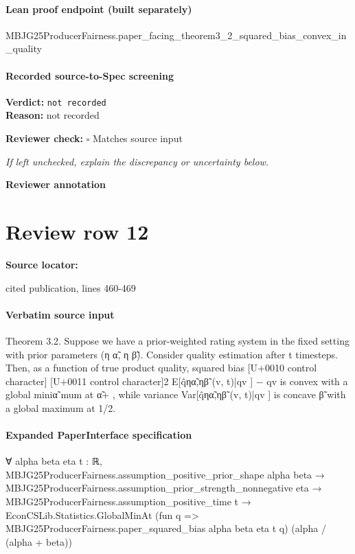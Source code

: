 \documentclass[10pt]{article}
\newcommand{\reviewerbox}{%
  \par\noindent\fbox{\parbox{0.96\linewidth}{\rule{0pt}{0.38in}}}\par
}
\newcommand{\reviewmatch}[1]{%
  \par\noindent\textbf{Reviewer check:} $\square$\; #1\par
  \noindent\emph{If left unchecked, explain the discrepancy or uncertainty below.}\par
}
\begin{document}
\paragraph{Lean proof endpoint (built separately)}\begin{ReviewVerbatim}
MBJG25ProducerFairness.paper_facing_theorem3_2_squared_bias_convex_in_quality
\end{ReviewVerbatim}

\paragraph{Recorded source-to-Spec screening}
\textbf{Verdict:} \texttt{not recorded}
\\
\textbf{Reason:} not recorded
\reviewmatch{Matches source input}
\noindent\textbf{Reviewer annotation}\par
\reviewerbox
\clearpage
\hypertarget{source-claim-444ef89e21ba4476}{}
\section*{Review row 12}
\textbf{Source locator:} {\footnotesize\raggedright cited publication, lines 460-\allowbreak{}469\par}
\paragraph{Verbatim source input}
\begin{ReviewVerbatim}
Theorem 3.2. Suppose we have a prior-weighted rating system in the fixed setting with prior parameters (η α̃, η β̃). Consider quality estimation after t timesteps.
Then, as a function of true product quality, squared bias
[U+0010 control character]
[U+0011 control character]2
E[q̂ηα̃,ηβ̃ (v, t)|qv ] − qv
is convex with a global miniα̃
mum at α̃+
, while variance Var[q̂ηα̃,ηβ̃ (v, t)|qv ] is concave
β̃
with a global maximum at 1/2.
\end{ReviewVerbatim}


\paragraph{Expanded PaperInterface specification}
\begin{ReviewVerbatim}
∀ {alpha beta eta t : ℝ},
  MBJG25ProducerFairness.assumption_positive_prior_shape alpha beta →
    MBJG25ProducerFairness.assumption_prior_strength_nonnegative eta →
      MBJG25ProducerFairness.assumption_positive_time t →
        EconCSLib.Statistics.GlobalMinAt (fun q => MBJG25ProducerFairness.paper_squared_bias alpha beta eta t q)
          (alpha / (alpha + beta))
\end{ReviewVerbatim}
\end{document}
